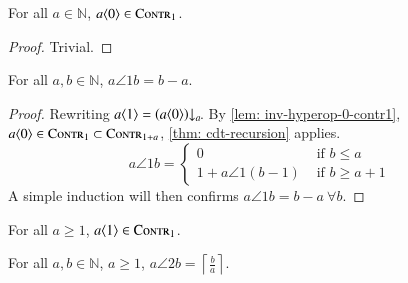 \begin{lem}  \label{lem: inv-hyperop-0-contr1}
For all $a\in \mathbb{N}$, $a\langle 0\rangle\in \text{\scshape{Contr}}_1$.
\end{lem}
\begin{proof}
Trivial.
\end{proof}

\begin{thm}
For all $a, b\in \mathbb{N}$, $a\angle{1}b = b - a$.
\end{thm}
\begin{proof}
Rewriting $a\angle{1} = \cdt{\left(a\angle{0}\right)}{a}$. By \cref{lem: inv-hyperop-0-contr1}, $a\langle 0\rangle \in \text{\scshape{Contr}}_1 \subset \text{\scshape{Contr}}_{1+a}$, \cref{thm: cdt-recursion} applies.
$$ a\angle{1}b = \begin{cases}
0 & \text{ if } b\le a \\ 1 + a\angle{1}(b - 1) & \text{ if } b\ge a+1
\end{cases} $$
A simple induction will then confirms $a\angle{1}b = b - a \ \forall b$.
\end{proof}

\begin{col} \label{col: inv-hyperop-1-contr1}
For all $a\ge 1$, $a\langle 1\rangle \in \text{\scshape{Contr}}_1$.
\end{col}

\begin{col}
For all $a, b\in \mathbb{N}$, $a\ge 1$, $a\angle{2}b = \displaystyle \left\lceil \frac{b}{a} \right\rceil$.
\end{col}


